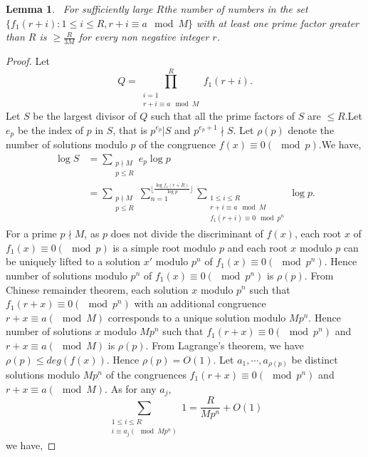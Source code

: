 \documentclass{amsart}
\newtheorem{Lemma 1}{Lemma}[section]
\newtheorem{Lemma 3}[Lemma 1]{Lemma}
\newtheorem{Lucas The}[Lemma 1]{Theorem}
\newtheorem{num}[Lemma 1]{Lemma}
\newtheorem{lem 1}[Lemma 1]{Lemma}
\newtheorem{Corollary 1}[Lemma 1]{Corollary}
\newtheorem{Corollary 2}[Lemma 1]{Corollary}
\begin{document}
	\begin{num}\label{Lemma 4} For sufficiently large $R$the number of numbers in the set $\{f_1(r+i) : 1\leq i \leq R,r+i\equiv a \mod M \}$ with at least one prime factor greater than $R$ is $\geq \frac{R}{3M}$ for every non negative integer $r$. \end{num}\begin{proof}Let \[Q=\prod_{\substack{i=1\\r+i\equiv a\mod M}}^{R}f_1(r+i).\]Let $S$ be the largest divisor of $Q$ such that all the prime factors of $S$ are $\leq R$.Let $e_p$ be the index of $p$ in $S$, that is $p^{e_p}|S$ and $p^{e_p+1}\nmid S$. Let $\rho(p)$ denote the number of solutions modulo $p$ of the congruence $f(x)\equiv 0 (\mod p)$.We have,\begin{align}\log S&=\sum_{\substack{p\nmid M\\p\leq R}}e_p\log p \\&=\sum_{\substack{p\nmid M\\p\leq R}}\sum_{n=1}^{\lfloor\frac{\log f_1(r+R)}{\log p}\rfloor}\sum_{\substack{1\leq i\leq R\\r+i\equiv a\mod M\\f_1(r+i)\equiv 0 \mod p^n}}\log p.\label{key}\end{align}For a prime $p\nmid M$, as $p$ does not divide the discriminant of $f(x)$, each root $x$ of $f_1(x)\equiv 0 (\mod p)$ is a simple root modulo $p$ and each root $x$ modulo $p$ can be uniquely lifted to a solution $x'$ modulo $p^n$ of $f_1(x)\equiv 0 (\mod p^n)$. Hence number of solutions modulo $p^n$ of $f_1(x)\equiv 0(\mod p^n)$ is $\rho(p)$. From Chinese remainder theorem, each solution $x$ modulo $p^n$ such that $f_1(r+x)\equiv 0 (\mod p^n)$ with an additional congruence $r+x\equiv a (\mod M)$ corresponds to a unique solution modulo $Mp^n$. Hence number of solutions $x$ modulo $Mp^n$ such that $f_1(r+x)\equiv 0 (\mod p^n)$ and $r+x\equiv a (\mod M)$ is $\rho(p)$. From Lagrange's theorem, we have $\rho(p)\leq deg(f(x))$. Hence $\rho(p)=O(1).$
		Let $a_1,\cdots, a_{\rho(p)}$ be distinct solutions modulo $Mp^n$ of the congruences $f_1(r+x)\equiv 0 (\mod p^n)$ and $r+x\equiv a (\mod M)$. As for any $a_j$, \[\sum_{\substack{1\leq i \leq R\\i\equiv a_j(\mod Mp^n)}}1=\frac{R}{Mp^n}+O(1)\] we have,

\end{proof}
\end{document}
